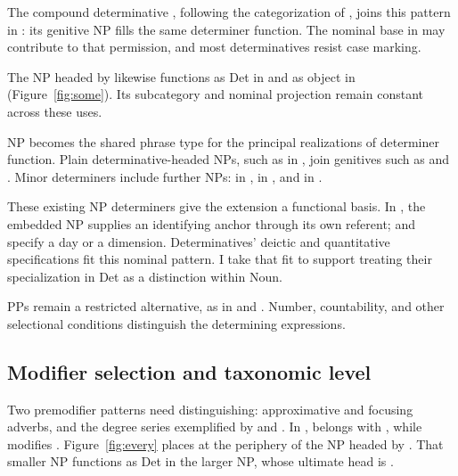 \documentclass[12pt]{article}
\begin{document}
The compound determinative , following the categorization of \textcite[§1.3]{Payne2007}, joins this pattern in : its genitive NP fills the same determiner function. The nominal base in  may contribute to that permission, and most determinatives resist case marking.

The NP headed by  likewise functions as Det in  and as object in  (Figure~\ref{fig:some}). Its subcategory and nominal projection remain constant across these uses.

NP becomes the shared phrase type for the principal realizations of determiner function. Plain determinative-headed NPs, such as  in , join genitives such as  and . Minor determiners include further NPs:  in ,  in , and  in  \citep[356]{huddleston2002}.

These existing NP determiners give the extension a functional basis. In , the embedded NP supplies an identifying anchor through its own referent;  and  specify a day or a dimension. Determinatives' deictic and quantitative specifications fit this nominal pattern. I take that fit to support treating their specialization in Det as a distinction within Noun.

PPs remain a restricted alternative, as in  and  \citep[356]{huddleston2002}. Number, countability, and other selectional conditions distinguish the determining expressions.

\subsection{Modifier selection and taxonomic level}\label{sec:payne}

Two premodifier patterns need distinguishing: approximative and focusing adverbs, and the degree series exemplified by  and . In ,  belongs with , while  modifies . Figure~\ref{fig:every} places  at the periphery of the NP headed by . That smaller NP functions as Det in the larger NP, whose ultimate head is .
\end{document}
